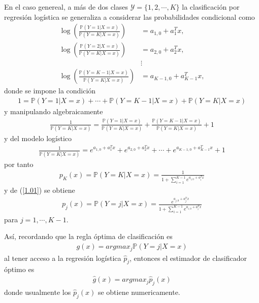 \documentclass[a4paper, 11pt]{article}
\begin{document}
En el caso genereal, a más de dos clases $\mathcal{Y} = \{ 1,2,\cdots,K\} $ la clasificación por regresión logística se generaliza a considerar las probabilidades condicional como 
\begin{align}
  \log \left( \frac{\mathbb{P}(Y=1|X=x )}{\mathbb{P}(Y=K|X=x )}\right) &= a_{1,0} + a_{1}^T  x, \label{1.01}\\
  \log \left( \frac{\mathbb{P}(Y=2|X=x )}{\mathbb{P}(Y=K|X=x )}\right) &= a_{2,0} + a_{2}^T  x,\nonumber\\
  &\vdots \nonumber\\
  \log \left( \frac{\mathbb{P}(Y=K-1|X=x )}{\mathbb{P}(Y=K|X=x )}\right) &= a_{K-1,0} + a_{K-1}^T  x, \nonumber
\end{align}
donde se impone la condición 
\begin{align*}
  1 = \mathbb{P}(Y=1|X=x ) + \cdots + \mathbb{P}(Y=K-1|X=x ) + \mathbb{P}(Y=K|X=x )
\end{align*}
y manipulando algebraicamente
\begin{align*}
  \frac{1}{\mathbb{P}(Y=K|X=x )} = \frac{\mathbb{P}(Y=1|X=x )}{\mathbb{P}(Y=K|X=x )} + \frac{\mathbb{P}(Y=K-1|X=x )}{\mathbb{P}(Y=K|X=x )} + 1
\end{align*}
y del modelo logístico
\begin{align*}
  \frac{1}{\mathbb{P}(Y=K|X=x )} = e^{a_{1,0} + a_{1}^T  x} + e^{a_{2,0} + a_{2}^T  x} + \cdots + e^{a_{K-1,0} + a_{K-1}^T  x} + 1
\end{align*}
por tanto
\begin{align*}
  p_K(x) = \mathbb{P}(Y=K|X=x ) = \frac{1}{1+\sum_{i = 1}^{K-1}e^{a_{i,0} + a_{i}^T x}}
\end{align*}
y de (\ref{1.01}) se obtiene
\begin{align*}
  p_j(x ) = \mathbb{P}(Y=j|X=x ) = \frac{e^{a_{j,0} + a_{j}^T x}}{1+\sum_{i = 1}^{K-1}e^{a_{i,0} + a_{i}^T x}}
\end{align*}
para $j = 1,\cdots, K-1$.

Así, recordando que la regla óptima de clasificación es
\begin{align*}
  g(x) = argmax_{j} \mathbb{P}(Y = j|X=x)
\end{align*}
al tener acceso a la regresión logística $\hat{p}_j$, entonces el estimador de clasificador óptimo es 
\begin{align}
  \hat{g}(x) = argmax_{j} \hat{p}_j(x )
\end{align}
donde usualmente los $\hat{p}_j(x )$ se obtiene numericamente.
\end{document}
